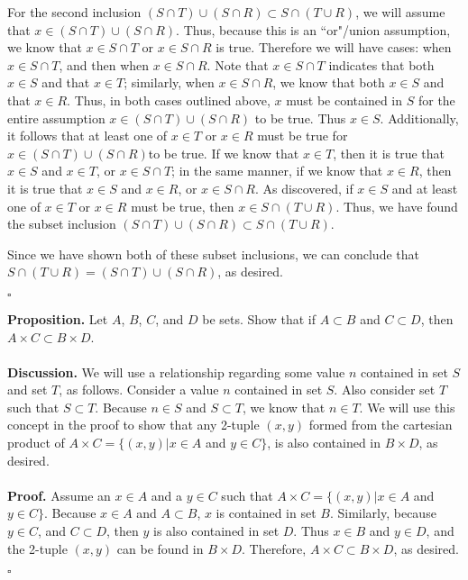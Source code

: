 \documentclass[12pt]{exam}
\begin{document}
\begin{questions}
\par
For the second inclusion $(S \cap T) \cup (S \cap R) \subset S \cap (T \cup R)$, we will assume that $x \in (S \cap T) \cup (S \cap R)$. Thus, because this is an ``or"/union assumption, we know that $x \in S \cap T$ or $x \in S \cap R$ is true. Therefore we will have cases: when $x \in S \cap T$, and then when $x \in S \cap R$. Note that $x \in S \cap T$ indicates that both $x \in S$ and that $x \in T$; similarly, when $x \in S \cap R$, we know that both $x \in S$ and that $x \in R$. Thus, in both cases outlined above, $x$ must be contained in $S$ for the entire assumption $x \in (S \cap T) \cup (S \cap R)$ to be true. Thus $x \in S$. Additionally, it follows that at least one of $x \in T$ or $x \in R$ must be true for $x \in (S \cap T) \cup (S \cap R)$to be true. If we know that $x \in T$, then it is true that $x \in S$ and $x \in T$, or $x \in S \cap T$; in the same manner, if we know that $x \in R$, then it is true that $x \in S$ and $x \in R$, or $x \in S \cap R$. As discovered, if $x \in S$ and at least one of $x \in T$ or $x \in R$ must be true, then $x \in S \cap (T \cup R)$. Thus, we have found the subset inclusion $(S \cap T) \cup (S \cap R) \subset S \cap (T \cup R)$.
\par 
Since we have shown both of these subset inclusions, we can conclude that $S \cap (T \cup R) = (S \cap T) \cup (S \cap R)$, as desired.
\begin{flushright}
$\square$
\end{flushright}

\question
\textbf{Proposition.} Let $A$, $B$, $C$, and $D$ be sets. Show that if $A \subset B$ and  $C \subset D$, then $A \times C \subset B \times D$.
\\
\\\textbf{Discussion.} We will use a relationship regarding some value $n$ contained in set $S$ and set $T$, as follows. Consider a value $n$ contained in set $S$. Also consider set $T$ such that $S \subset T$. Because $n \in S$ and $S \subset T$, we know that $n \in T$. We will use this concept in the proof to show that any 2-tuple $(x, y)$ formed from the cartesian product of $A \times C = \{(x, y) | x \in A$ and $y \in C\}$, is also contained in $B \times D$, as desired.
\\
\\\textbf{Proof.} Assume an $x \in A$ and a $y \in C$ such that $A \times C = \{(x, y) | x \in A$ and $y \in C\}$. Because $x \in A$ and $A \subset B$, $x$ is contained in set $B$. Similarly, because $y \in C$, and $C \subset D$, then $y$ is also contained in set $D$. Thus $x \in B$ and $y \in D$, and the 2-tuple $(x, y)$ can be found in $B \times D$. Therefore, $A \times C \subset B \times D$, as desired.
\begin{flushright}
$\square$
\end{flushright}


\end{questions}
\end{document}
